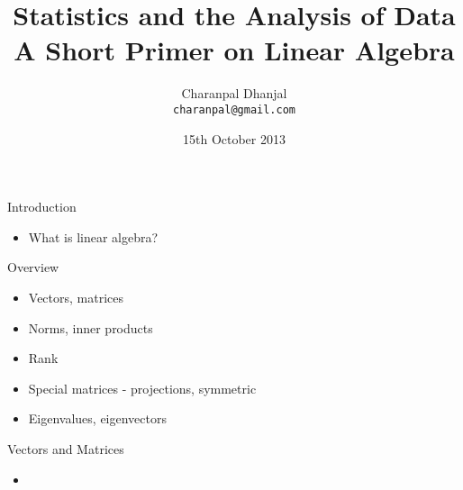 \documentclass{beamer}
\title{Statistics and the Analysis of Data\\ A Short Primer on Linear Algebra}
\author{Charanpal Dhanjal \\ \texttt{charanpal@gmail.com}}
\institute{\'{E}cole des Ponts}
\date{15th October 2013}
\begin{document}
\frame{\titlepage}

\begin{frame}{Introduction}
\begin{itemize} 
 \item What is linear algebra? 
\end{itemize}

\end{frame}


\begin{frame}{Overview} 
\begin{itemize}
 \item Vectors, matrices 
 \item Norms, inner products 
 \item Rank 
 \item Special matrices - projections, symmetric 
 \item Eigenvalues, eigenvectors 
\end{itemize} 
\end{frame}

\begin{frame}{Vectors and Matrices}
\begin{itemize} 
 \item 
\end{itemize}
 
\end{frame}
\end{document}
